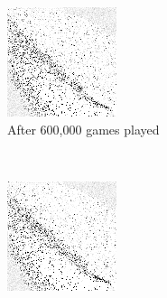 \begin{figure}
	\begin{subfigure}[t]{0.3\textwidth}
	\includegraphics[width=\textwidth]{images/findings/round1/flipbook_d.png}
	\caption{After 600,000 games played}
	\end{subfigure}
	~
	\begin{subfigure}[t]{0.3\textwidth}
	\includegraphics[width=\textwidth]{images/findings/round1/flipbook_e.png}

\end{subfigure}
\end{figure}
